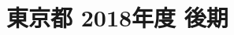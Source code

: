 \documentclass[../../hsm_tok_q.tex]{subfiles}
\begin{document}
    \section{東京都 2018年度 後期}
    \subsection{　}
    
    \newpage
    \subsection{　}
    
    \newpage
    \subsection{　}
    
    \newpage
    \subsection{　}
    
    \newpage
    \subsection{　}
    
\end{document}
